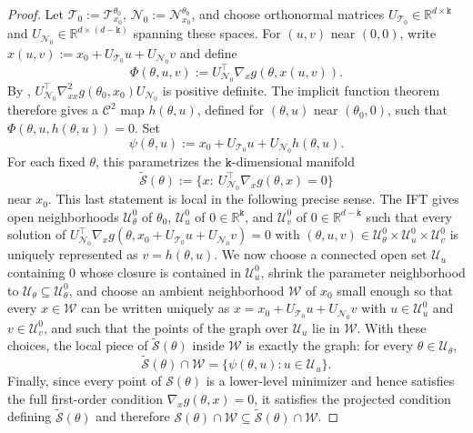 \documentclass{article}
\theoremstyle{normaltheorem}
\newcommand{\dimk}{\texttt{k}}
\newcommand{\R}{\mathbb{R}}
\newcommand{\calS}{\mathcal{S}}
\newcommand{\calT}{\mathcal{T}}
\newcommand{\calN}{\mathcal{N}}
\begin{document}
		\begin{proof}
		Let \(\calT_0:=\calT_{x_0}^{\theta_0}\), \(\calN_0:=\calN_{x_0}^{\theta_0}\), and choose orthonormal matrices
		\(U_{\calT_0}\in\R^{d\times \dimk}\) and \(U_{\calN_0}\in\R^{d\times(d-\dimk)}\) spanning these spaces. For
		\((u,v)\) near \((0,0)\), write \(x(u,v):=x_0+U_{\calT_0}u+U_{\calN_0}v\) and define
		\[
		\Phi(\theta,u,v):=U_{\calN_0}^{\top}\nabla_x g(\theta,x(u,v)).
		\]
		By , \(U_{\calN_0}^{\top}\nabla^2_{xx}g(\theta_0,x_0)U_{\calN_0}\) is positive definite.
		The implicit function theorem therefore gives a \(\mathcal{C}^{2}\) map
		\(h(\theta,u)\), defined for \((\theta,u)\) near \((\theta_0,0)\), such that
		\(\Phi(\theta,u,h(\theta,u))=0\). Set
		\[
		\psi(\theta,u):=x_0+U_{\calT_0}u+U_{\calN_0}h(\theta,u).
		\]
		For each fixed \(\theta\), this parametrizes the \(\dimk\)-dimensional manifold
		\[
		\widetilde{\calS}(\theta):=\{x:\ U_{\calN_0}^{\top}\nabla_x g(\theta,x)=0\}
		\]
		near \(x_0\). This last statement is local in the following precise sense. The IFT gives open neighborhoods
		\(\mathcal U_\theta^{0}\) of \(\theta_0\), \(\mathcal U_u^{0}\) of \(0\in\R^{\dimk}\), and
		\(\mathcal U_v^{0}\) of \(0\in\R^{d-\dimk}\) such that every solution of
		\(U_{\calN_0}^{\top}\nabla_x g(\theta,x_0+U_{\calT_0}u+U_{\calN_0}v)=0\) with
		\((\theta,u,v)\in\mathcal U_\theta^{0}\times\mathcal U_u^{0}\times\mathcal U_v^{0}\) is uniquely represented as
		\(v=h(\theta,u)\). We now choose a connected open set \(\mathcal U_u\) containing \(0\) whose closure is contained in
		\(\mathcal U_u^{0}\), shrink the parameter neighborhood to
		\(\mathcal U_\theta\subseteq\mathcal U_\theta^{0}\), and choose an ambient neighborhood \(\mathcal W\) of \(x_0\)
		small enough so that every \(x\in\mathcal W\) can be written uniquely as
		\(x=x_0+U_{\calT_0}u+U_{\calN_0}v\) with \(u\in\mathcal U_u^{0}\) and \(v\in\mathcal U_v^{0}\), and such that
		the points of the graph over \(\mathcal U_u\) lie in \(\mathcal W\). With these choices, the local piece of
		\(\widetilde{\calS}(\theta)\) inside \(\mathcal W\) is exactly the graph:
		for every \(\theta\in\mathcal U_\theta\),
		\[
		\widetilde{\calS}(\theta)\cap\mathcal W
		=
		\{\psi(\theta,u):u\in\mathcal U_u\}.
		\]
		Finally, since every point of \(\calS(\theta)\) is a lower-level minimizer and hence satisfies the full first-order
		condition \(\nabla_x g(\theta,x)=0\), it satisfies the projected condition defining
		\(\widetilde{\calS}(\theta)\) and therefore
		\(\calS(\theta)\cap\mathcal W\subseteq\widetilde{\calS}(\theta)\cap\mathcal W\).


\end{proof}
\end{document}
